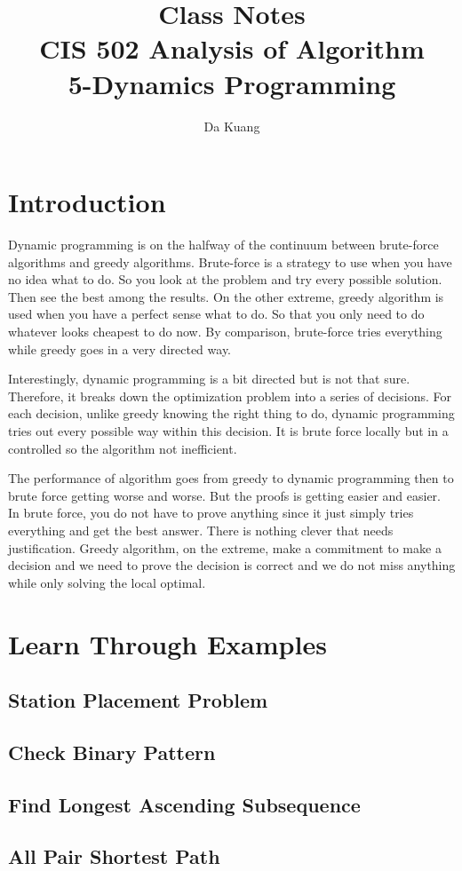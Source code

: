 \documentclass[en,hazy,blue,normal,12pt]{elegantnote}
\title{Class Notes\\CIS 502 Analysis of Algorithm\\5-Dynamics Programming}
\author{Da Kuang}
\institute{University of Pennsylvania}
\date{}
\begin{document}
\maketitle
\newpage
\tableofcontents
\newpage
% 
\section{Introduction}
Dynamic programming is on the halfway of the continuum between brute-force algorithms and greedy algorithms. Brute-force is a strategy to use when you have no idea what to do. So you look at the problem and try every possible solution. Then see the best among the results. On the other extreme, greedy algorithm is used when you have a perfect sense what to do. So that you only need to do whatever looks cheapest to do now. By comparison, brute-force tries everything while greedy goes in a very directed way.

Interestingly, dynamic programming is a bit directed but is not that sure. Therefore, it breaks down the optimization problem into a series of decisions. For each decision, unlike greedy knowing the right thing to do, dynamic programming tries out every possible way within this decision. It is brute force locally but in a controlled so the algorithm not inefficient.

The performance of algorithm goes from greedy to dynamic programming then to brute force getting worse and worse. But the proofs is getting easier and easier. In brute force, you do not have to prove anything since it just simply tries everything and get the best answer. There is nothing clever that needs justification. Greedy algorithm, on the extreme, make a commitment to make a decision and we need to prove the decision is correct and we do not miss anything while only solving the local optimal.

\section{Learn Through Examples}
\subsection{Station Placement Problem}


\subsection{Check Binary Pattern}


\subsection{Find Longest Ascending Subsequence}


\subsection{All Pair Shortest Path}

\end{document}
